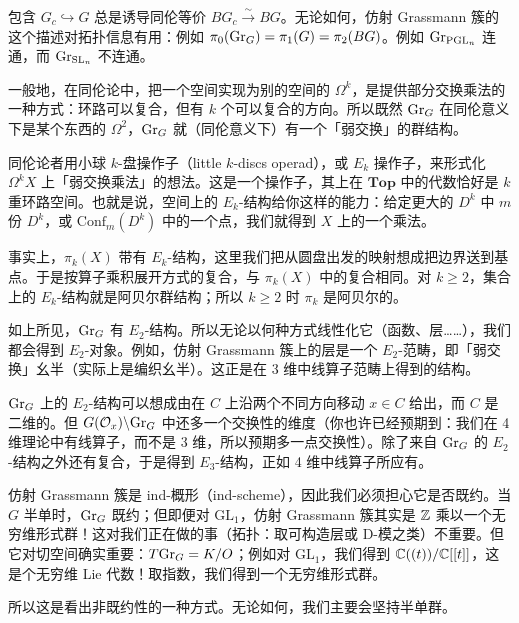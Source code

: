 包含 $G_c\hookrightarrow G$ 总是诱导同伦等价 $BG_c\xrightarrow{\sim}BG$。无论如何，仿射 Grassmann 簇的这个描述对拓扑信息有用：例如 $\pi_0(\mathrm{Gr}_G)=\pi_1(G)=\pi_2(BG)$。例如 $\mathrm{Gr}_{\mathrm{PGL}_n}$ 连通，而 $\mathrm{Gr}_{\mathrm{SL}_n}$ 不连通。

一般地，在同伦论中，把一个空间实现为别的空间的 $\Omega^k$，是提供部分交换乘法的一种方式：环路可以复合，但有 $k$ 个可以复合的方向。所以既然 $\mathrm{Gr}_G$ 在同伦意义下是某个东西的 $\Omega^2$，$\mathrm{Gr}_G$ 就（同伦意义下）有一个「弱交换」的群结构。

同伦论者用小球 $k$-盘操作子（little $k$-discs operad），或 $E_k$ 操作子，来形式化 $\Omega^kX$ 上「弱交换乘法」的想法。这是一个操作子，其上在 $\mathbf{Top}$ 中的代数恰好是 $k$ 重环路空间。也就是说，空间上的 $E_k$-结构给你这样的能力：给定更大的 $D^k$ 中 $m$ 份 $D^k$，或 $\mathrm{Conf}_m(D^k)$ 中的一个点，我们就得到 $X$ 上的一个乘法。

事实上，$\pi_k(X)$ 带有 $E_k$-结构，这里我们把从圆盘出发的映射想成把边界送到基点。于是按算子乘积展开方式的复合，与 $\pi_k(X)$ 中的复合相同。对 $k\ge 2$，集合上的 $E_k$-结构就是阿贝尔群结构；所以 $k\ge 2$ 时 $\pi_k$ 是阿贝尔的。

如上所见，$\mathrm{Gr}_G$ 有 $E_2$-结构。所以无论以何种方式线性化它（函数、层……），我们都会得到 $E_2$-对象。例如，仿射 Grassmann 簇上的层是一个 $E_2$-范畴，即「弱交换」幺半（实际上是编织幺半）。这正是在 3 维中线算子范畴上得到的结构。

$\mathrm{Gr}_G$ 上的 $E_2$-结构可以想成由在 $C$ 上沿两个不同方向移动 $x\in C$ 给出，而 $C$ 是二维的。但 $G(\mathcal{O}_x)\backslash\mathrm{Gr}_G$ 中还多一个交换性的维度（你也许已经预期到：我们在 4 维理论中有线算子，而不是 3 维，所以预期多一点交换性）。除了来自 $\mathrm{Gr}_G$ 的 $E_2$-结构之外还有复合，于是得到 $E_3$-结构，正如 4 维中线算子所应有。

\begin{remark}
仿射 Grassmann 簇是 ind-概形（ind-scheme），因此我们必须担心它是否既约。当 $G$ 半单时，$\mathrm{Gr}_G$ 既约；但即便对 $\mathrm{GL}_1$，仿射 Grassmann 簇其实是 $\mathbb{Z}$ 乘以一个无穷维形式群！这对我们正在做的事（拓扑：取可构造层或 D-模之类）不重要。但它对切空间确实重要：$T\mathrm{Gr}_G=K/O$；例如对 $\mathrm{GL}_1$，我们得到 $\mathbb{C}((t))/\mathbb{C}[[t]]$，这是个无穷维 Lie 代数！取指数，我们得到一个无穷维形式群。

所以这是看出非既约性的一种方式。无论如何，我们主要会坚持半单群。
\end{remark}

